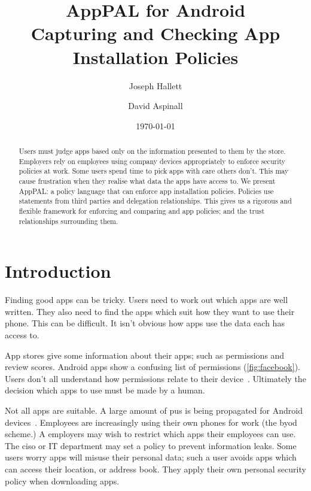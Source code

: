 \documentclass[a4paper]{scrartcl}
\title{AppPAL for Android\\
Capturing and Checking App Installation Policies}
\author{Joseph Hallett \and David Aspinall}
\date{\today}
\newcommand{\comment}[1]{}%
\begin{document}
\maketitle

\begin{abstract}
  Users must judge apps based only on the information presented to them by the store.
  Employers rely on employees using company devices appropriately to enforce security policies at work.
  Some users spend time to pick apps with care others don't.
  This may cause frustration when they realise what data the apps have access to.
  We present AppPAL: a policy language that can enforce app installation policies.
  Policies use statements from third parties and delegation relationships.
  This gives us a rigorous and flexible framework for enforcing and comparing and app policies; and the trust relationships surrounding them.
\end{abstract}

\section{Introduction \comment{1 page}}
\label{sec:introduction}

Finding good apps can be tricky.
Users need to work out which apps are well written.
They also need to find the apps which suit how they want to use their phone.
This can be difficult.
It isn't obvious how apps use the data each has access to.

App stores give some information about their apps; such as permissions and review scores.
Android apps show a confusing list of permissions (\autoref{fig:facebook}).
Users don't all understand how permissions relate to their device~\citep{Felt:2012hm,Thompson:2013eb}.
Ultimately the decision which apps to use must be made by a human.

Not all apps are suitable. 
A large amount of \ac{pus} is being propagated for Android devices~\citep{Truong:2014bi,Svajcer:2013tp}. 
Employees are increasingly using their own phones for work (the \ac{byod} scheme.)
A employers may wish to restrict which apps their employees can use.
The \ac{ciso} or IT department may set a policy to prevent information leaks.
Some users worry apps will misuse their personal data;
  such a user avoids apps which can access their location, or address book.
They apply their own personal security policy when downloading apps.
\end{document}
